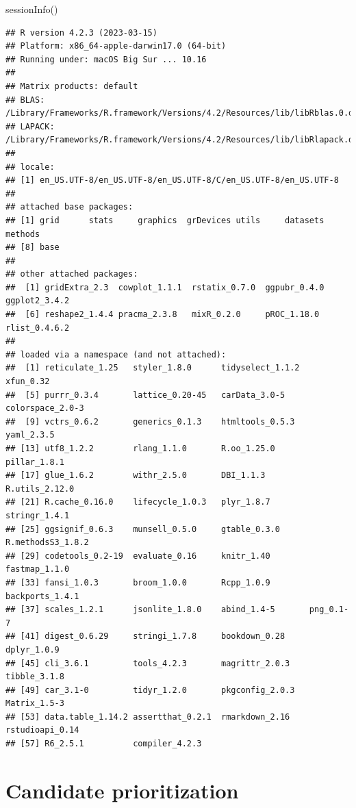 \documentclass[
  11pt,
  oneside]{book}
\newenvironment{Shaded}{\begin{snugshade}}{\end{snugshade}}
\newcommand{\FunctionTok}[1]{\textcolor[rgb]{0.00,0.00,0.00}{#1}}
\newcommand{\NormalTok}[1]{#1}
\begin{document}
\begin{Shaded}
\begin{Highlighting}[]
\FunctionTok{sessionInfo}\NormalTok{()}
\end{Highlighting}
\end{Shaded}

\begin{verbatim}
## R version 4.2.3 (2023-03-15)
## Platform: x86_64-apple-darwin17.0 (64-bit)
## Running under: macOS Big Sur ... 10.16
## 
## Matrix products: default
## BLAS:   /Library/Frameworks/R.framework/Versions/4.2/Resources/lib/libRblas.0.dylib
## LAPACK: /Library/Frameworks/R.framework/Versions/4.2/Resources/lib/libRlapack.dylib
## 
## locale:
## [1] en_US.UTF-8/en_US.UTF-8/en_US.UTF-8/C/en_US.UTF-8/en_US.UTF-8
## 
## attached base packages:
## [1] grid      stats     graphics  grDevices utils     datasets  methods  
## [8] base     
## 
## other attached packages:
##  [1] gridExtra_2.3  cowplot_1.1.1  rstatix_0.7.0  ggpubr_0.4.0   ggplot2_3.4.2 
##  [6] reshape2_1.4.4 pracma_2.3.8   mixR_0.2.0     pROC_1.18.0    rlist_0.4.6.2 
## 
## loaded via a namespace (and not attached):
##  [1] reticulate_1.25   styler_1.8.0      tidyselect_1.1.2  xfun_0.32        
##  [5] purrr_0.3.4       lattice_0.20-45   carData_3.0-5     colorspace_2.0-3 
##  [9] vctrs_0.6.2       generics_0.1.3    htmltools_0.5.3   yaml_2.3.5       
## [13] utf8_1.2.2        rlang_1.1.0       R.oo_1.25.0       pillar_1.8.1     
## [17] glue_1.6.2        withr_2.5.0       DBI_1.1.3         R.utils_2.12.0   
## [21] R.cache_0.16.0    lifecycle_1.0.3   plyr_1.8.7        stringr_1.4.1    
## [25] ggsignif_0.6.3    munsell_0.5.0     gtable_0.3.0      R.methodsS3_1.8.2
## [29] codetools_0.2-19  evaluate_0.16     knitr_1.40        fastmap_1.1.0    
## [33] fansi_1.0.3       broom_1.0.0       Rcpp_1.0.9        backports_1.4.1  
## [37] scales_1.2.1      jsonlite_1.8.0    abind_1.4-5       png_0.1-7        
## [41] digest_0.6.29     stringi_1.7.8     bookdown_0.28     dplyr_1.0.9      
## [45] cli_3.6.1         tools_4.2.3       magrittr_2.0.3    tibble_3.1.8     
## [49] car_3.1-0         tidyr_1.2.0       pkgconfig_2.0.3   Matrix_1.5-3     
## [53] data.table_1.14.2 assertthat_0.2.1  rmarkdown_2.16    rstudioapi_0.14  
## [57] R6_2.5.1          compiler_4.2.3
\end{verbatim}

\hypertarget{03_candidate_prioritization}{%
\chapter{Candidate prioritization}\label{03_candidate_prioritization}}
\end{document}
